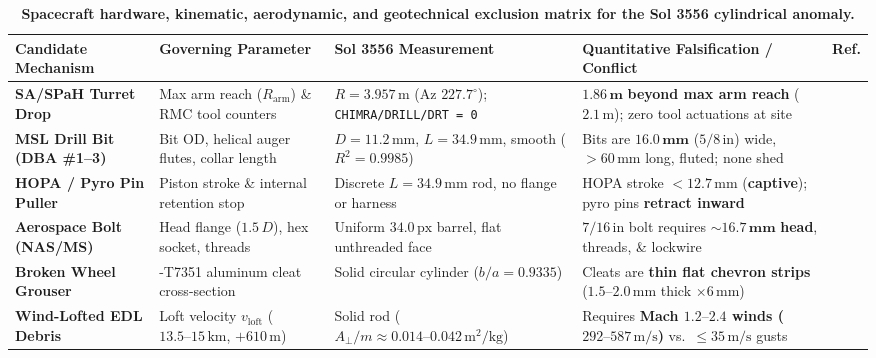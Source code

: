 \documentclass[11pt,a4paper]{article}
\begin{document}
\begin{table}[!ht]
\centering
\footnotesize
\setlength{\tabcolsep}{4pt}
\renewcommand{\arraystretch}{1.26}
\caption{\textbf{Spacecraft hardware, kinematic, aerodynamic, and geotechnical exclusion matrix for the Sol 3556 cylindrical anomaly.}}
\label{tab:hardware_exclusion}
\vspace{2pt}
\begin{tabular}{>{\raggedright\arraybackslash}p{2.75cm}>{\raggedright\arraybackslash}p{2.75cm}>{\raggedright\arraybackslash}p{3.05cm}>{\raggedright\arraybackslash}p{4.65cm}>{\centering\arraybackslash}p{1.2cm}}
\toprule
\textbf{Candidate Mechanism} & \textbf{Governing Parameter} & \textbf{Sol 3556 Measurement} & \textbf{Quantitative Falsification / Conflict} & \textbf{Ref.} \\
\midrule
\textbf{SA/SPaH Turret Drop} & Max arm reach ($R_{\text{arm}}$) \& RMC tool counters & $R = 3.957\,\text{m}$ (Az $227.7^\circ$); \texttt{CHIMRA/DRILL/DRT = 0} & $\mathbf{1.86\,\text{m}}$ \textbf{beyond max arm reach} ($2.1\,\text{m}$); zero tool actuations at site & \cite{anderson2012} \\
\textbf{MSL Drill Bit (DBA \#1--3)} & Bit OD, helical auger flutes, collar length & $D = 11.2\,\text{mm}$, $L = 34.9\,\text{mm}$, smooth ($R^2 = 0.9985$) & Bits are $\mathbf{16.0\,\text{mm}}$ ($5/8\,\text{in}$) wide, $>60\,\text{mm}$ long, fluted; none shed & \cite{anderson2012,okon2010} \\
\textbf{HOPA / Pyro Pin Puller} & Piston stroke \& internal retention stop & Discrete $L = 34.9\,\text{mm}$ rod, no flange or harness & HOPA stroke $<12.7\,\text{mm}$ (\textbf{captive}); pyro pins \textbf{retract inward} & \cite{bement1995} \\
\textbf{Aerospace Bolt (NAS/MS)} & Head flange ($1.5\,D$), hex socket, threads & Uniform $34.0\,\text{px}$ barrel, flat unthreaded face & $7/16\,\text{in}$ bolt requires $\mathbf{\sim 16.7\,\text{mm}}$ \textbf{head}, threads, \& lockwire & \cite{anderson2012} \\
\textbf{Broken Wheel Grouser} & 7075-T7351 aluminum cleat cross-section & Solid circular cylinder ($b/a = 0.9335$) & Cleats are \textbf{thin flat chevron strips} ($1.5\text{--}2.0\,\text{mm}$ thick $\times 6\,\text{mm}$) & \cite{arvidson2017,toupet2020} \\
\textbf{Wind-Lofted EDL Debris} & Loft velocity $v_{\text{loft}}$ ($13.5\text{--}15\,\text{km}$, $+610\,\text{m}$) & Solid rod ($A_\perp/m \approx 0.014\text{--}0.042\,\text{m}^2/\text{kg}$) & Requires \textbf{Mach $1.2\text{--}2.4$ winds ($292\text{--}587\,\text{m/s}$)} vs.\ $\le 35\,\text{m/s}$ gusts & \cite{viudez2019,kornfeld2014} \\

\end{tabular}
\end{table}
\end{document}
